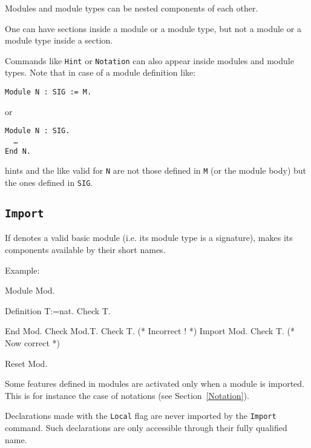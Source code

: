 \begin{Remarks}
\item Modules and module types can be nested components of each other.
\item One can have sections inside a module or a module type, but
  not a module or a module type inside a section.
\item Commands like \texttt{Hint} or \texttt{Notation} can
  also appear inside modules and module types. Note that in case of a
  module definition like:

    \smallskip
    \noindent
    {\tt Module N : SIG := M.} 
    \smallskip

    or

    \smallskip
    {\tt Module N : SIG.\\
      \ \ \dots\\
      End N.}
    \smallskip 
    
    hints and the like valid for \texttt{N} are not those defined in
    \texttt{M} (or the module body) but the ones defined in
    \texttt{SIG}.

\end{Remarks}

\subsection{\tt Import {\qualid}
\label{Import}}

If {\qualid} denotes a valid basic module (i.e. its module type is a
signature), makes its components available by their short names.

Example:

\begin{coq_example}
Module Mod.
\end{coq_example}
\begin{coq_example}
  Definition T:=nat.
  Check T.
\end{coq_example}
\begin{coq_example}
End Mod.
Check Mod.T.
Check T. (* Incorrect ! *)
Import Mod.
Check T. (* Now correct *)
\end{coq_example}
\begin{coq_eval}
Reset Mod.
\end{coq_eval}

Some features defined in modules are activated only when a module is
imported. This is for instance the case of notations (see
Section~\ref{Notation}).

Declarations made with the {\tt Local} flag are never imported by the
{\tt Import} command. Such declarations are only accessible through their
fully qualified name.

